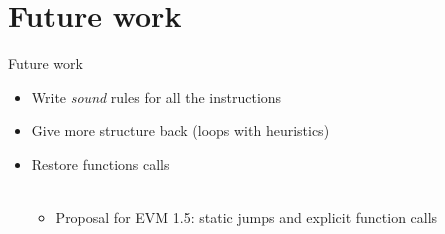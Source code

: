 \documentclass{beamer}
\begin{document}
\part{Future work}
\frame{\partpage}

\begin{frame}{Future work}
	\begin{itemize}
		\item Write \emph{sound} rules for all the instructions
		\item Give more structure back (loops with heuristics)
		\item Restore functions calls
		\\~\\
		\begin{itemize}
			\item Proposal for EVM 1.5: static jumps and explicit function calls
		\end{itemize}
	\end{itemize}
\end{frame}




%
\end{document}
